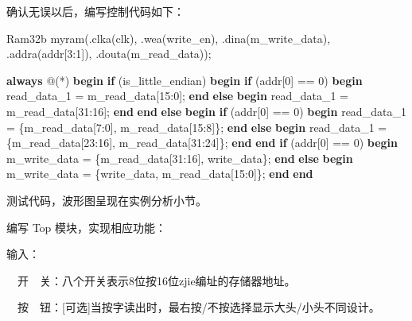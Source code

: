 \documentclass[UTF8]{ctexart}
\newenvironment{Shaded}{}{}
\newcommand{\DecValTok}[1]{\textcolor[rgb]{0.25,0.63,0.44}{#1}}
\newcommand{\KeywordTok}[1]{\textcolor[rgb]{0.00,0.44,0.13}{\textbf{#1}}}
\newcommand{\NormalTok}[1]{#1}
\begin{document}
确认无误以后，编写控制代码如下：

\begin{Shaded}
\begin{Highlighting}[]
\NormalTok{Ram32b myram(.clka(clk), .wea(write_en), .dina(m_write_data), .addra(addr[}\DecValTok{3}\NormalTok{:}\DecValTok{1}\NormalTok{]), .douta(m_read_data));}

\KeywordTok{always}\NormalTok{ @(*) }\KeywordTok{begin}
    \KeywordTok{if}\NormalTok{ (is_little_endian) }\KeywordTok{begin}
        \KeywordTok{if}\NormalTok{ (addr[}\DecValTok{0}\NormalTok{] == }\DecValTok{0}\NormalTok{) }\KeywordTok{begin}
\NormalTok{            read_data_}\DecValTok{1}\NormalTok{ = m_read_data[}\DecValTok{15}\NormalTok{:}\DecValTok{0}\NormalTok{];}
        \KeywordTok{end} \KeywordTok{else} \KeywordTok{begin}
\NormalTok{            read_data_}\DecValTok{1}\NormalTok{ = m_read_data[}\DecValTok{31}\NormalTok{:}\DecValTok{16}\NormalTok{];}
        \KeywordTok{end}
    \KeywordTok{end} \KeywordTok{else} \KeywordTok{begin}
        \KeywordTok{if}\NormalTok{ (addr[}\DecValTok{0}\NormalTok{] == }\DecValTok{0}\NormalTok{) }\KeywordTok{begin}
\NormalTok{            read_data_}\DecValTok{1}\NormalTok{ = \{m_read_data[}\DecValTok{7}\NormalTok{:}\DecValTok{0}\NormalTok{], m_read_data[}\DecValTok{15}\NormalTok{:}\DecValTok{8}\NormalTok{]\};}
        \KeywordTok{end} \KeywordTok{else} \KeywordTok{begin}
\NormalTok{            read_data_}\DecValTok{1}\NormalTok{ = \{m_read_data[}\DecValTok{23}\NormalTok{:}\DecValTok{16}\NormalTok{], m_read_data[}\DecValTok{31}\NormalTok{:}\DecValTok{24}\NormalTok{]\};}
        \KeywordTok{end}
    \KeywordTok{end}
    \KeywordTok{if}\NormalTok{ (addr[}\DecValTok{0}\NormalTok{] == }\DecValTok{0}\NormalTok{) }\KeywordTok{begin}
\NormalTok{        m_write_data = \{m_read_data[}\DecValTok{31}\NormalTok{:}\DecValTok{16}\NormalTok{], write_data\};}
    \KeywordTok{end} \KeywordTok{else} \KeywordTok{begin}
\NormalTok{        m_write_data = \{write_data, m_read_data[}\DecValTok{15}\NormalTok{:}\DecValTok{0}\NormalTok{]\};}
    \KeywordTok{end}
\KeywordTok{end}
\end{Highlighting}
\end{Shaded}

测试代码，波形图呈现在实例分析小节。

编写 Top 模块，实现相应功能：

输入：

　开　关：八个开关表示8位按16位zjie编址的存储器地址。

　按　钮：{[}可选{]}当按字读出时，最右按/不按选择显示大头/小头不同设计。
\end{document}
